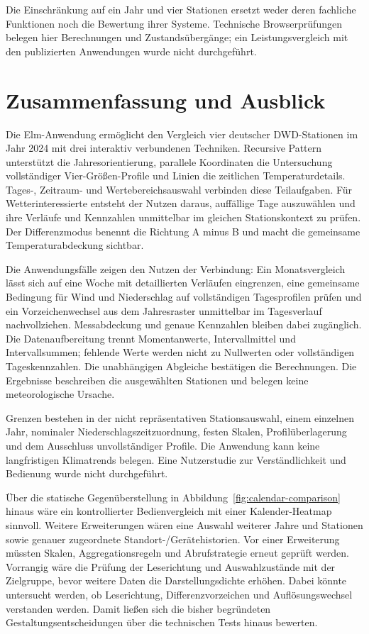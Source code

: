 \documentclass[usegeometry=true]{scrartcl}
\begin{document}
Die Einschränkung auf ein Jahr und vier Stationen ersetzt weder deren
fachliche Funktionen noch die Bewertung ihrer Systeme. Technische
Browserprüfungen belegen hier Berechnungen und Zustandsübergänge; ein
Leistungsvergleich mit den publizierten Anwendungen wurde nicht durchgeführt.

\section{Zusammenfassung und Ausblick}
Die Elm-Anwendung ermöglicht den Vergleich vier deutscher DWD-Stationen
im Jahr 2024 mit drei interaktiv verbundenen Techniken. Recursive Pattern
unterstützt die Jahresorientierung, parallele Koordinaten die Untersuchung
vollständiger Vier-Größen-Profile und Linien die zeitlichen Temperaturdetails.
Tages-, Zeitraum- und Wertebereichsauswahl verbinden diese Teilaufgaben.
Für Wetterinteressierte entsteht der Nutzen daraus, auffällige Tage
auszuwählen und ihre Verläufe und Kennzahlen unmittelbar im gleichen
Stationskontext zu prüfen. Der Differenzmodus benennt die Richtung
A minus B und macht die gemeinsame Temperaturabdeckung sichtbar.

Die Anwendungsfälle zeigen den Nutzen der Verbindung: Ein Monatsvergleich
lässt sich auf eine Woche mit detaillierten Verläufen eingrenzen, eine
gemeinsame Bedingung für Wind und Niederschlag auf vollständigen Tagesprofilen
prüfen und ein Vorzeichenwechsel aus dem Jahresraster unmittelbar im
Tagesverlauf nachvollziehen. Messabdeckung und genaue Kennzahlen bleiben
dabei zugänglich. Die Datenaufbereitung trennt Momentanwerte,
Intervallmittel und Intervallsummen; fehlende Werte werden nicht zu
Nullwerten oder vollständigen Tageskennzahlen. Die unabhängigen Abgleiche
bestätigen die Berechnungen. Die Ergebnisse beschreiben die ausgewählten
Stationen und belegen keine meteorologische Ursache.

Grenzen bestehen in der nicht repräsentativen Stationsauswahl, einem
einzelnen Jahr, nominaler Niederschlagszeitzuordnung, festen Skalen,
Profilüberlagerung und dem Ausschluss unvollständiger Profile.
Die Anwendung kann keine langfristigen Klimatrends belegen. Eine Nutzerstudie zur Verständlichkeit und Bedienung wurde nicht durchgeführt.

Über die statische Gegenüberstellung in Abbildung~\ref{fig:calendar-comparison}
hinaus wäre ein kontrollierter Bedienvergleich mit einer Kalender-Heatmap
sinnvoll. Weitere Erweiterungen wären eine Auswahl weiterer Jahre und Stationen sowie
genauer zugeordnete Standort-/Gerätehistorien. Vor einer Erweiterung
müssten Skalen, Aggregationsregeln und Abrufstrategie erneut geprüft
werden. Vorrangig wäre die Prüfung der Leserichtung und Auswahlzustände mit
der Zielgruppe, bevor weitere Daten die Darstellungsdichte erhöhen.
Dabei könnte untersucht werden, ob
Leserichtung, Differenzvorzeichen und Auflösungswechsel verstanden werden.
Damit ließen sich die bisher begründeten Gestaltungsentscheidungen
über die technischen Tests hinaus bewerten.
\end{document}
